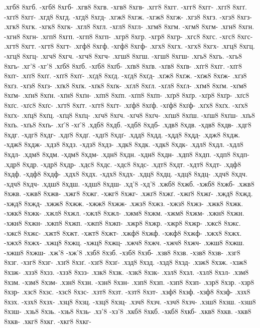 {.хгб8 8хгб. -хгб8 8хгб-
.хгв8 8хгв. -хгв8 8хгв-
.хгг8 8хгг. -хгг8 8хгг-
.хгґ8 8хгґ. -хгґ8 8хгґ-
.хгд8 8хгд. -хгд8 8хгд-
.хгж8 8хгж. -хгж8 8хгж-
.хгз8 8хгз. -хгз8 8хгз-
.хгк8 8хгк. -хгк8 8хгк-
.хгл8 8хгл. -хгл8 8хгл-
.хгм8 8хгм. -хгм8 8хгм-
.хгн8 8хгн. -хгн8 8хгн-
.хгп8 8хгп. -хгп8 8хгп-
.хгр8 8хгр. -хгр8 8хгр-
.хгс8 8хгс. -хгс8 8хгс-
.хгт8 8хгт. -хгт8 8хгт-
.хгф8 8хгф. -хгф8 8хгф-
.хгх8 8хгх. -хгх8 8хгх-
.хгц8 8хгц. -хгц8 8хгц-
.хгч8 8хгч. -хгч8 8хгч-
.хгш8 8хгш. -хгш8 8хгш-
.хгь8 8хгь. -хгь8 8хгь-
.хг'8 -хг'8
.хґб8 8хґб. -хґб8 8хґб-
.хґв8 8хґв. -хґв8 8хґв-
.хґг8 8хґг. -хґг8 8хґг-
.хґґ8 8хґґ. -хґґ8 8хґґ-
.хґд8 8хґд. -хґд8 8хґд-
.хґж8 8хґж. -хґж8 8хґж-
.хґз8 8хґз. -хґз8 8хґз-
.хґк8 8хґк. -хґк8 8хґк-
.хґл8 8хґл. -хґл8 8хґл-
.хґм8 8хґм. -хґм8 8хґм-
.хґн8 8хґн. -хґн8 8хґн-
.хґп8 8хґп. -хґп8 8хґп-
.хґр8 8хґр. -хґр8 8хґр-
.хґс8 8хґс. -хґс8 8хґс-
.хґт8 8хґт. -хґт8 8хґт-
.хґф8 8хґф. -хґф8 8хґф-
.хґх8 8хґх. -хґх8 8хґх-
.хґц8 8хґц. -хґц8 8хґц-
.хґч8 8хґч. -хґч8 8хґч-
.хґш8 8хґш. -хґш8 8хґш-
.хґь8 8хґь. -хґь8 8хґь-
.хґ'8 -хґ'8
.хдб8 8хдб. -хдб8 8хдб-
.хдв8 8хдв. -хдв8 8хдв-
.хдг8 8хдг. -хдг8 8хдг-
.хдґ8 8хдґ. -хдґ8 8хдґ-
.хдд8 8хдд. -хдд8 8хдд-
.хдж8 8хдж. -хдж8 8хдж-
.хдз8 8хдз. -хдз8 8хдз-
.хдк8 8хдк. -хдк8 8хдк-
.хдл8 8хдл. -хдл8 8хдл-
.хдм8 8хдм. -хдм8 8хдм-
.хдн8 8хдн. -хдн8 8хдн-
.хдп8 8хдп. -хдп8 8хдп-
.хдр8 8хдр. -хдр8 8хдр-
.хдс8 8хдс. -хдс8 8хдс-
.хдт8 8хдт. -хдт8 8хдт-
.хдф8 8хдф. -хдф8 8хдф-
.хдх8 8хдх. -хдх8 8хдх-
.хдц8 8хдц. -хдц8 8хдц-
.хдч8 8хдч. -хдч8 8хдч-
.хдш8 8хдш. -хдш8 8хдш-
.хд'8 -хд'8
.хжб8 8хжб. -хжб8 8хжб-
.хжв8 8хжв. -хжв8 8хжв-
.хжг8 8хжг. -хжг8 8хжг-
.хжґ8 8хжґ. -хжґ8 8хжґ-
.хжд8 8хжд. -хжд8 8хжд-
.хжж8 8хжж. -хжж8 8хжж-
.хжз8 8хжз. -хжз8 8хжз-
.хжк8 8хжк. -хжк8 8хжк-
.хжл8 8хжл. -хжл8 8хжл-
.хжм8 8хжм. -хжм8 8хжм-
.хжн8 8хжн. -хжн8 8хжн-
.хжп8 8хжп. -хжп8 8хжп-
.хжр8 8хжр. -хжр8 8хжр-
.хжс8 8хжс. -хжс8 8хжс-
.хжт8 8хжт. -хжт8 8хжт-
.хжф8 8хжф. -хжф8 8хжф-
.хжх8 8хжх. -хжх8 8хжх-
.хжц8 8хжц. -хжц8 8хжц-
.хжч8 8хжч. -хжч8 8хжч-
.хжш8 8хжш. -хжш8 8хжш-
.хж'8 -хж'8
.хзб8 8хзб. -хзб8 8хзб-
.хзв8 8хзв. -хзв8 8хзв-
.хзг8 8хзг. -хзг8 8хзг-
.хзґ8 8хзґ. -хзґ8 8хзґ-
.хзд8 8хзд. -хзд8 8хзд-
.хзж8 8хзж. -хзж8 8хзж-
.хзз8 8хзз. -хзз8 8хзз-
.хзк8 8хзк. -хзк8 8хзк-
.хзл8 8хзл. -хзл8 8хзл-
.хзм8 8хзм. -хзм8 8хзм-
.хзн8 8хзн. -хзн8 8хзн-
.хзп8 8хзп. -хзп8 8хзп-
.хзр8 8хзр. -хзр8 8хзр-
.хзс8 8хзс. -хзс8 8хзс-
.хзт8 8хзт. -хзт8 8хзт-
.хзф8 8хзф. -хзф8 8хзф-
.хзх8 8хзх. -хзх8 8хзх-
.хзц8 8хзц. -хзц8 8хзц-
.хзч8 8хзч. -хзч8 8хзч-
.хзш8 8хзш. -хзш8 8хзш-
.хзь8 8хзь. -хзь8 8хзь-
.хз'8 -хз'8
.хкб8 8хкб. -хкб8 8хкб-
.хкв8 8хкв. -хкв8 8хкв-
.хкг8 8хкг. -хкг8 8хкг-
}
